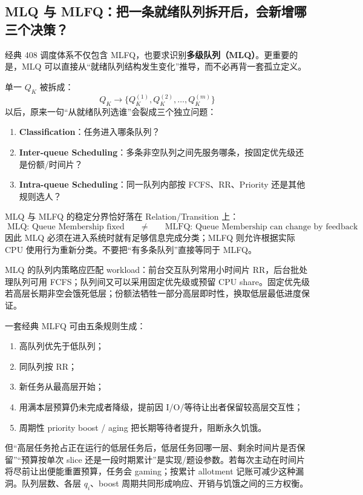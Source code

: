 \documentclass[11pt,a4paper]{ctexart}
\newcommand{\kw}[1]{\textbf{#1}}
\begin{document}
\subsection{MLQ 与 MLFQ：把一条就绪队列拆开后，会新增哪三个决策？}

经典 408 调度体系不仅包含 MLFQ，也要求识别\kw{多级队列（MLQ）}。更重要的是，MLQ 可以直接从“就绪队列结构发生变化”推导，而不必再背一套孤立定义。

单一 $Q_K$ 被拆成：
\[
Q_K\longrightarrow\{Q_K^{(1)},Q_K^{(2)},\ldots,Q_K^{(m)}\}
\]
以后，原来一句“从就绪队列选谁”会裂成三个独立问题：
\begin{enumerate}
\item \kw{Classification}：任务进入哪条队列？
\item \kw{Inter-queue Scheduling}：多条非空队列之间先服务哪条，按固定优先级还是份额/时间片？
\item \kw{Intra-queue Scheduling}：同一队列内部按 FCFS、RR、Priority 还是其他规则选人？
\end{enumerate}

MLQ 与 MLFQ 的稳定分界恰好落在 Relation/Transition 上：
\[
\boxed{
\text{MLQ: Queue Membership fixed}
\qquad\neq\qquad
\text{MLFQ: Queue Membership can change by feedback}
}
\]
因此 MLQ 必须在进入系统时就有足够信息完成分类；MLFQ 则允许根据实际 CPU 使用行为重新分类。不要把“有多条队列”直接等同于 MLFQ。

MLQ 的队列内策略应匹配 workload：前台交互队列常用小时间片 RR，后台批处理队列可用 FCFS；队列间又可以采用固定优先级或预留 CPU share。固定优先级若高层长期非空会饿死低层；份额法牺牲一部分高层即时性，换取低层最低进度保证。

\begin{center}

\end{center}

\begin{method}
一套经典 MLFQ 可由五条规则生成：
\begin{enumerate}
\item 高队列优先于低队列；
\item 同队列按 RR；
\item 新任务从最高层开始；
\item 用满本层预算仍未完成者降级，提前因 I/O/等待让出者保留较高层交互性；
\item 周期性 priority boost / aging 把长期等待者提升，阻断永久饥饿。
\end{enumerate}
但“高层任务抢占正在运行的低层任务后，低层任务回哪一层、剩余时间片是否保留”“预算按单次 slice 还是一段时期累计”是实现/题设参数。若每次主动在时间片将尽前让出便能重置预算，任务会 gaming；按累计 allotment 记账可减少这种漏洞。队列层数、各层 $q_i$、boost 周期共同形成响应、开销与饥饿之间的三方权衡。
\end{method}
\end{document}
